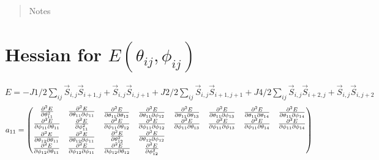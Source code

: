 \documentclass[9pt]{article}
\title{}
\author{}
\begin{document}
\maketitle

\begin{abstract}
Notes
\end{abstract}
\section{Hessian for $E(\theta_{ij},\phi_{ij})$}
$E = -J1/2\sum_{ij}\vec{S}_{i,j}\vec{S}_{i+1,j}+\vec{S}_{i,j}\vec{S}_{i,j+1}+J2/2\sum_{ij}\vec{S}_{i,j}\vec{S}_{i+1,j+1}+J4/2\sum_{ij}\vec{S}_{i,j}\vec{S}_{i+2,j}+\vec{S}_{i,j}\vec{S}_{i,j+2}$
\begin{equation*}
	a_{11} = 
	\begin{pmatrix}
		\begin{matrix} 
			\pdv[2]{E}{\theta_{11}} & \pdv{E}{\theta_{11}}{\phi_{11}} \\
			\pdv{E}{\phi_{11}}{\theta_{11}} & \pdv[2]{E}{\phi_{11}}
		\end{matrix}& 	
		\begin{matrix} 
			\pdv{E}{\theta_{11}}{\theta_{12}} & \pdv{E}{\theta_{11}}{\phi_{12}} \\
			\pdv{E}{\phi_{11}}{\theta_{12}} & \pdv{E}{\phi_{11}}{\phi_{12}} 
		\end{matrix}& 
		\begin{matrix} 
			\pdv{E}{\theta_{11}}{\theta_{13}} & \pdv{E}{\theta_{11}}{\phi_{13}} \\
			\pdv{E}{\phi_{11}}{\theta_{13}} & \pdv{E}{\phi_{11}}{\phi_{13}} 
		\end{matrix}&
		\begin{matrix} 
			\pdv{E}{\theta_{11}}{\theta_{14}} & \pdv{E}{\theta_{11}}{\phi_{14}} \\
			\pdv{E}{\phi_{11}}{\theta_{14}} & \pdv{E}{\phi_{11}}{\phi_{14}} 
		\end{matrix}\\
		\begin{matrix} 
			\pdv{E}{\theta_{12}}{\theta_{11}} & \pdv{E}{\theta_{12}}{\phi_{11}} \\
			\pdv{E}{\phi_{12}}{\theta_{11}} & \pdv{E}{\phi_{12}}{\phi_{11}} 
		\end{matrix} & 
		\begin{matrix} 
			\pdv[2]{E}{\theta_{12}} & \pdv{E}{\theta_{12}}{\phi_{12}} \\
			\pdv{E}{\phi_{12}}{\theta_{12}} & \pdv[2]{E}{\phi_{12}} 
		\end{matrix}&

\end{pmatrix}
\end{equation*}
\end{document}
